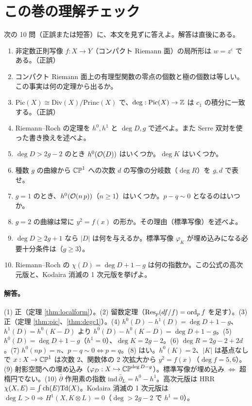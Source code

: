 \section{この巻の理解チェック}\label{sec:check}
次の 10 問（正誤または短答）に、本文を見ずに答えよ。解答は直後にある。
\begin{enumerate}
\item 非定数正則写像 $f:X\to Y$（コンパクト Riemann 面）の局所形は $w=z^e$ である。（正誤）
\item コンパクト Riemann 面上の有理型関数の零点の個数と極の個数は等しい。この事実は何の定理から出るか。
\item $\mathrm{Pic}(X)\cong\mathrm{Div}(X)/\mathrm{Princ}(X)$ で、$\deg:\mathrm{Pic}(X)\to\mathbb Z$ は $c_1$ の積分に一致する。（正誤）
\item Riemann--Roch の定理を $h^0,h^1$ と $\deg D,g$ で述べよ。また Serre 双対を使った書き換えを述べよ。
\item $\deg D>2g-2$ のとき $h^0(\mathcal O(D))$ はいくつか。$\deg K$ はいくつか。
\item 種数 $g$ の曲線から $\mathbb{CP}^1$ への次数 $d$ の写像の分岐数（$\deg R$）を $g,d$ で表せ。
\item $g=1$ のとき、$h^0(\mathcal O(n\,p))$（$n\ge1$）はいくつか。$p-q\sim0$ となるのはいつか。
\item $g=2$ の曲線は常に $y^2=f(x)$ の形か。その理由（標準写像）を述べよ。
\item $\deg D\ge2g+1$ なら $|D|$ は何を与えるか。標準写像 $\varphi_K$ が埋め込みになる必要十分条件は（$g\ge3$）。
\item Riemann--Roch の $\chi(D)=\deg D+1-g$ は何の指数か。この公式の高次元版と、Kodaira 消滅の 1 次元版を挙げよ。
\end{enumerate}
\paragraph{解答。}
(1) 正（定理 \ref{thm:localform}）。(2) 留数定理（$\operatorname{Res}_p(df/f)=\operatorname{ord}_pf$ を足す）。(3) 正（定理 \ref{thm:pic}、\ref{thm:degc1}）。(4) $h^0(D)-h^1(D)=\deg D+1-g$、$h^1(D)=h^0(K-D)$ より $h^0(D)-h^0(K-D)=\deg D+1-g$。(5) $h^0(D)=\deg D+1-g$（$h^1=0$）、$\deg K=2g-2$。(6) $\deg R=2g-2+2d$。(7) $h^0(np)=n$、$p-q\sim0\iff p=q$。(8) はい。$h^0(K)=2$、$|K|$ は基点なしで $x:X\to\mathbb{CP}^1$ は次数 $2$、関数体の 2 次拡大から $y^2=f(x)$（$\deg f=5,6$）。(9) 射影空間への埋め込み（$\varphi_D:X\hookrightarrow\mathbb{CP}^{\deg D-g}$）。標準写像が埋め込み $\iff$ 超楕円でない。(10) $\bar\partial$ 作用素の指数 $\mathrm{ind}\,\bar\partial_L=h^0-h^1$。高次元版は HRR $\chi(X,E)=\int\mathrm{ch}(E)\mathrm{Td}(X)$。Kodaira 消滅の 1 次元版は $\deg L>0\Rightarrow H^1(X,K\otimes L)=0$（$\deg>2g-2$ で $h^1=0$）。

